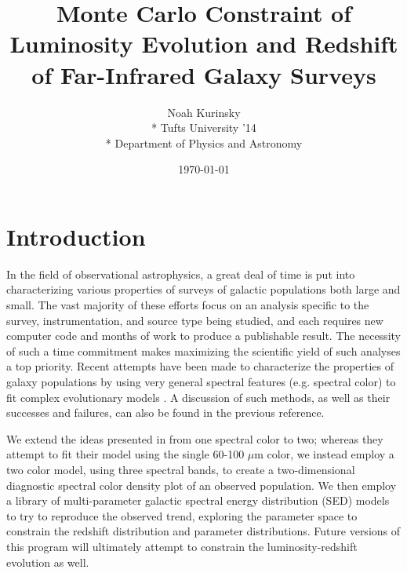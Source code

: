 \documentclass[twocolumn,letterpaper,10pt]{article}
\title{Monte Carlo Constraint of Luminosity Evolution and Redshift of Far-Infrared Galaxy Surveys}
\author{Noah Kurinsky\\*
  \small Tufts University '14\\*
  \small Department of Physics and Astronomy}
\date{\small \today}
\begin{document}

\section{Introduction}
In the field of observational astrophysics, a great deal of time is put into characterizing various properties of surveys of galactic populations both large and small. The vast majority of these efforts focus on an analysis specific to the survey, instrumentation, and source type being studied, and each requires new computer code and months of work to produce a publishable result. The necessity of such a time commitment makes maximizing the scientific yield of such analyses a top priority. Recent attempts have been made to characterize the properties of galaxy populations by using very general spectral features (e.g. spectral color) to fit complex evolutionary models \citep[e.g. redshift-luminosity evolution, as in ][]{marsden11}. A discussion of such methods, as well as their successes and failures, can also be found in the previous reference.

We extend the ideas presented in \citet{marsden11} from one spectral color to two; whereas they attempt to fit their model using the single 60-100 $\mu$m color, we instead employ a two color model, using three spectral bands, to create a two-dimensional diagnostic spectral color density plot of an observed population. We then employ a library of multi-parameter galactic spectral energy distribution (SED) models to try to reproduce the observed trend, exploring the parameter space to constrain the redshift distribution and parameter distributions. Future versions of this program will ultimately attempt to constrain the luminosity-redshift evolution as well. 
\end{document}
